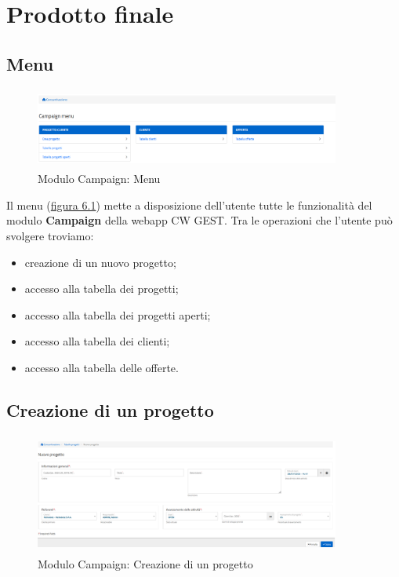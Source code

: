 \chapter{Prodotto finale}
\label{cap:prodotto-finale}


\setlength{\parskip}{3ex}

\section{Menu}
\begin{figure}[!h]
\centering
\includegraphics[width=380px, height=100px]{../images/UI/01-menu.png}
\caption{Modulo Campaign: Menu}
\label{fig:menu}
\end{figure}

\noindent Il menu ({\hyperref[fig:menu]{figura 6.1}}) mette a disposizione dell'utente tutte le funzionalità del modulo \textbf{Campaign} della webapp CW GEST. Tra le operazioni che l'utente può svolgere troviamo:
\begin{itemize}
\item creazione di un nuovo progetto;
\item accesso alla tabella dei progetti;
\item accesso alla tabella dei progetti aperti;
\item accesso alla tabella dei clienti;
\item accesso alla tabella delle offerte.
\end{itemize}

\pagebreak

\section{Creazione di un progetto}
\begin{figure}[!h]
\centering
\includegraphics[width=380px, height=150px]{../images/UI/02-nuovoProgetto.png}
\caption{Modulo Campaign: Creazione di un progetto}
\label{fig:nuovoProgetto}
\end{figure}

